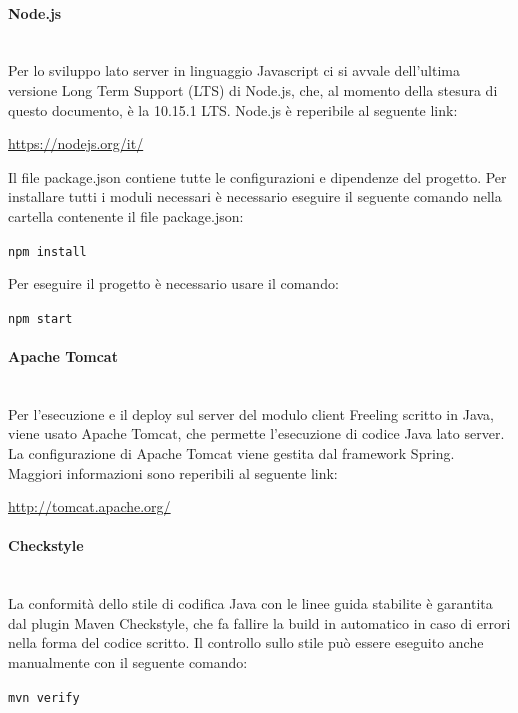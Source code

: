 \paragraph{Node.js}\mbox{}\\
Per lo sviluppo lato server in linguaggio Javascript ci si avvale dell'ultima versione Long Term Support (LTS) di Node.js, che, al momento della stesura di questo documento, è la 10.15.1 LTS.
Node.js è reperibile al seguente link:
\begin{center}
	\url{https://nodejs.org/it/}
\end{center} 
Il file package.json contiene tutte le configurazioni e dipendenze del progetto. Per installare tutti i moduli necessari è necessario eseguire il seguente comando nella cartella contenente il file package.json:
\begin{center}
	\texttt{npm install}
\end{center}
Per eseguire il progetto è necessario usare il comando:
\begin{center}
	\texttt{npm start}
\end{center}

\paragraph{Apache Tomcat}\mbox{}\\
Per l'esecuzione e il deploy sul server del modulo client Freeling scritto in Java, viene usato Apache Tomcat, che permette l'esecuzione di codice Java lato server. La configurazione di Apache Tomcat viene gestita dal framework Spring.
Maggiori informazioni sono reperibili al seguente link:\newline
\begin{center}
	\url{http://tomcat.apache.org/}
\end{center}

\paragraph{Checkstyle}\mbox{}\\
La conformità dello stile di codifica Java con le linee guida stabilite è garantita dal plugin Maven Checkstyle, che fa fallire la build in automatico in caso di errori nella forma del codice scritto. Il controllo sullo stile può essere eseguito anche manualmente con il seguente comando:
\begin{center}
	\texttt{mvn verify}
\end{center}

